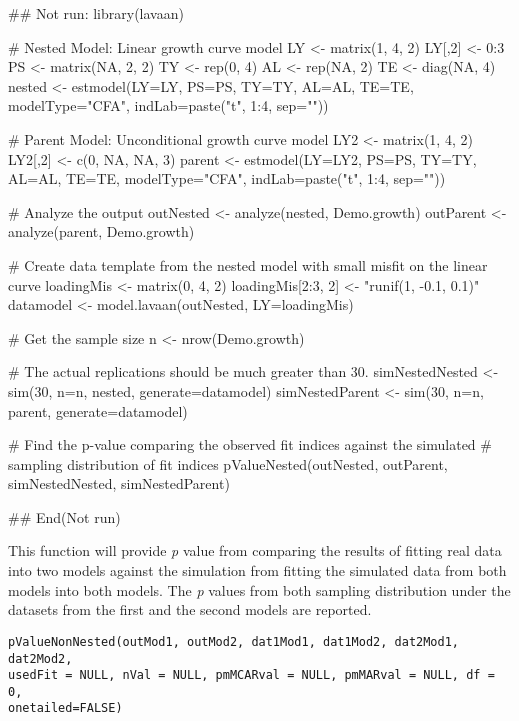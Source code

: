 \documentclass[a4paper]{book}
\begin{document}
\begin{Examples}
\begin{ExampleCode}
## Not run: 
library(lavaan)

# Nested Model: Linear growth curve model
LY <- matrix(1, 4, 2)
LY[,2] <- 0:3
PS <- matrix(NA, 2, 2)
TY <- rep(0, 4)
AL <- rep(NA, 2)
TE <- diag(NA, 4)
nested <- estmodel(LY=LY, PS=PS, TY=TY, AL=AL, TE=TE, modelType="CFA", 
	indLab=paste("t", 1:4, sep=""))

# Parent Model: Unconditional growth curve model
LY2 <- matrix(1, 4, 2)
LY2[,2] <- c(0, NA, NA, 3)
parent <- estmodel(LY=LY2, PS=PS, TY=TY, AL=AL, TE=TE, modelType="CFA", 
	indLab=paste("t", 1:4, sep=""))

# Analyze the output
outNested <- analyze(nested, Demo.growth)
outParent <- analyze(parent, Demo.growth)

# Create data template from the nested model with small misfit on the linear curve
loadingMis <- matrix(0, 4, 2)
loadingMis[2:3, 2] <- "runif(1, -0.1, 0.1)"
datamodel <- model.lavaan(outNested, LY=loadingMis)

# Get the sample size
n <- nrow(Demo.growth)

# The actual replications should be much greater than 30.
simNestedNested <- sim(30, n=n, nested, generate=datamodel) 
simNestedParent <- sim(30, n=n, parent, generate=datamodel)

# Find the p-value comparing the observed fit indices against the simulated 
# sampling distribution of fit indices
pValueNested(outNested, outParent, simNestedNested, simNestedParent)

## End(Not run)
\end{ExampleCode}
\end{Examples}
%
\begin{Description}\relax
This function will provide \emph{p} value from comparing the results of fitting real data into two models against the simulation from fitting the simulated data from both models into both models. The \emph{p} values from both sampling distribution under the datasets from the first and the second models are reported.
\end{Description}
%
\begin{Usage}
\begin{verbatim}
pValueNonNested(outMod1, outMod2, dat1Mod1, dat1Mod2, dat2Mod1, dat2Mod2, 
usedFit = NULL, nVal = NULL, pmMCARval = NULL, pmMARval = NULL, df = 0, 
onetailed=FALSE)
\end{verbatim}
\end{Usage}
\end{document}
